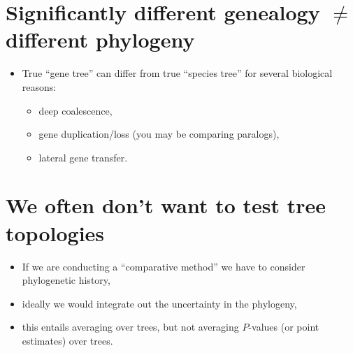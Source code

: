 \documentclass[landscape]{foils}
\begin{document}
\myNewSlide
\section*{Significantly different genealogy $\neq$ different phylogeny}
\begin{itemize}
	\item True ``gene tree'' can differ from true ``species tree'' for several biological reasons:
	\begin{itemize}
		\item deep coalescence,
		\item gene duplication/loss (you may be comparing paralogs),
		\item lateral gene transfer.
	\end{itemize}
\end{itemize}

 

\myNewSlide
\section*{We often don't want to test tree topologies}
\begin{itemize}
	\item If we are conducting a ``comparative method'' we have to consider phylogenetic history,
	\item ideally we would integrate out the uncertainty in the phylogeny,
	\item this entails averaging over trees, but not averaging $P$-values (or point estimates) over trees.
\end{itemize}

 

\myNewSlide
\normalsize


\myNewSlide
\end{document}
